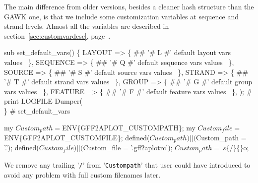 \documentclass[11pt]{article}
\def\nwendcode{\endtrivlist \endgroup} %
\let\nwdocspar=\par                    %
\begin{document}
The main difference from older versions, besides a cleaner hash structure than the GAWK one, is that we include some customization variables at sequence and strand levels. Almost all the variables are described in section~\ref{sec:customvardesc}, page~\pageref{sec:customvardesc}.

\nwenddocs{}\endmoddef
sub set_default_vars() \{
        LAYOUT   => \{           ## '# L #'
            \LA{}default layout vars values~{\nwtagstyle{}}\RA{}
        \},                    
        SEQUENCE => \{           ## '# Q #'
            \LA{}default sequence vars values~{\nwtagstyle{}}\RA{}
        \},                    
        SOURCE   => \{           ## '# S #'
            \LA{}default source vars values~{\nwtagstyle{}}\RA{}
        \},                    
        STRAND   => \{           ## '# T #'
            \LA{}default strand vars values~{\nwtagstyle{}}\RA{}
        \},                    
        GROUP    => \{           ## '# G #'
            \LA{}default group vars values~{\nwtagstyle{}}\RA{}
        \},                    
        FEATURE  => \{           ## '# F #'
            \LA{}default feature vars values~{\nwtagstyle{}}\RA{}
        \},
    ); # %
    print LOGFILE Dumper(\\%
\} # set_default_vars
\nwendcode{}\nwdocspar


\nwenddocs{}\plusendmoddef
my $Custom_path = $ENV\{GFF2APLOT_CUSTOMPATH\};
my $Custom_file = $ENV\{GFF2APLOT_CUSTOMFILE\};
defined($Custom_path) || ($Custom_path = '.');
defined($Custom_file) || ($Custom_file = '.gff2aplotrc');
$Custom_path =~ s\{/$\}\{\}o; 
\nwendcode{}\nwdocspar

We remove any trailing '{\tt{}/}' from '{\tt{}{}Custom{}path}' that user could have introduced to avoid any problem with full custom filenames later.
\end{document}
